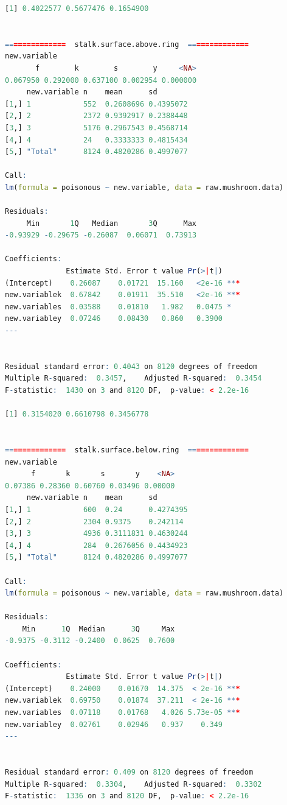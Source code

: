 \documentclass[12pt]{article}
\begin{document}
\begin{lstlisting}[language = R]
[1] 0.4022577 0.5677476 0.1654900


==============  stalk.surface.above.ring  ==============
new.variable
       f        k        s        y     <NA> 
0.067950 0.292000 0.637100 0.002954 0.000000 
     new.variable n    mean      sd       
[1,] 1            552  0.2608696 0.4395072
[2,] 2            2372 0.9392917 0.2388448
[3,] 3            5176 0.2967543 0.4568714
[4,] 4            24   0.3333333 0.4815434
[5,] "Total"      8124 0.4820286 0.4997077

Call:
lm(formula = poisonous ~ new.variable, data = raw.mushroom.data)

Residuals:
     Min       1Q   Median       3Q      Max 
-0.93929 -0.29675 -0.26087  0.06071  0.73913 

Coefficients:
              Estimate Std. Error t value Pr(>|t|)    
(Intercept)    0.26087    0.01721  15.160   <2e-16 ***
new.variablek  0.67842    0.01911  35.510   <2e-16 ***
new.variables  0.03588    0.01810   1.982   0.0475 *  
new.variabley  0.07246    0.08430   0.860   0.3900    
---


Residual standard error: 0.4043 on 8120 degrees of freedom
Multiple R-squared:  0.3457,	Adjusted R-squared:  0.3454 
F-statistic:  1430 on 3 and 8120 DF,  p-value: < 2.2e-16

[1] 0.3154020 0.6610798 0.3456778


==============  stalk.surface.below.ring  ==============
new.variable
      f       k       s       y    <NA> 
0.07386 0.28360 0.60760 0.03496 0.00000 
     new.variable n    mean      sd       
[1,] 1            600  0.24      0.4274395
[2,] 2            2304 0.9375    0.242114 
[3,] 3            4936 0.3111831 0.4630244
[4,] 4            284  0.2676056 0.4434923
[5,] "Total"      8124 0.4820286 0.4997077

Call:
lm(formula = poisonous ~ new.variable, data = raw.mushroom.data)

Residuals:
    Min      1Q  Median      3Q     Max 
-0.9375 -0.3112 -0.2400  0.0625  0.7600 

Coefficients:
              Estimate Std. Error t value Pr(>|t|)    
(Intercept)    0.24000    0.01670  14.375  < 2e-16 ***
new.variablek  0.69750    0.01874  37.211  < 2e-16 ***
new.variables  0.07118    0.01768   4.026 5.73e-05 ***
new.variabley  0.02761    0.02946   0.937    0.349    
---


Residual standard error: 0.409 on 8120 degrees of freedom
Multiple R-squared:  0.3304,	Adjusted R-squared:  0.3302 
F-statistic:  1336 on 3 and 8120 DF,  p-value: < 2.2e-16


\end{lstlisting}
\end{document}
